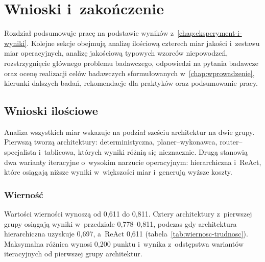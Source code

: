 \chapter{Wnioski i~zakończenie}\label{chap:wnioski-i-zakonczenie}

Rozdział podsumowuje pracę na podstawie wyników
z~\cref{chap:eksperyment-i-wyniki}. Kolejne sekcje obejmują analizę ilościową
czterech miar jakości i~zestawu miar operacyjnych, analizę jakościową typowych
wzorców niepowodzeń, rozstrzygnięcie głównego problemu badawczego, odpowiedzi
na pytania badawcze oraz ocenę realizacji celów badawczych sformułowanych
w~\cref{chap:wprowadzenie}, kierunki dalszych badań, rekomendacje dla praktyków
oraz podsumowanie pracy.

\section{Wnioski ilościowe}\label{sec:wnioski-ilosciowe}

Analiza wszystkich miar wskazuje na podział sześciu architektur na dwie grupy.
Pierwszą tworzą architektury: deterministyczna, planer--wykonawca,
router--specjalista i~tablicowa, których wyniki różnią się nieznacznie. Drugą
stanowią dwa warianty iteracyjne o~wysokim narzucie operacyjnym: hierarchiczna
i~ReAct, które osiągają niższe wyniki w~większości miar i~generują wyższe
koszty.

\subsection{Wierność}\label{subsec:wiernosc}

Wartości wierności wynoszą od 0{,}611 do 0{,}811. Cztery architektury
z~pierwszej grupy osiągają wyniki w~przedziale 0{,}778--0{,}811, podczas gdy
architektura hierarchiczna uzyskuje 0{,}697, a~ReAct 0{,}611
(tabela~\ref{tab:wiernosc-trudnosc}). Maksymalna różnica wynosi 0{,}200 punktu
i~wynika z~odstępstwa wariantów iteracyjnych od pierwszej grupy architektur.

